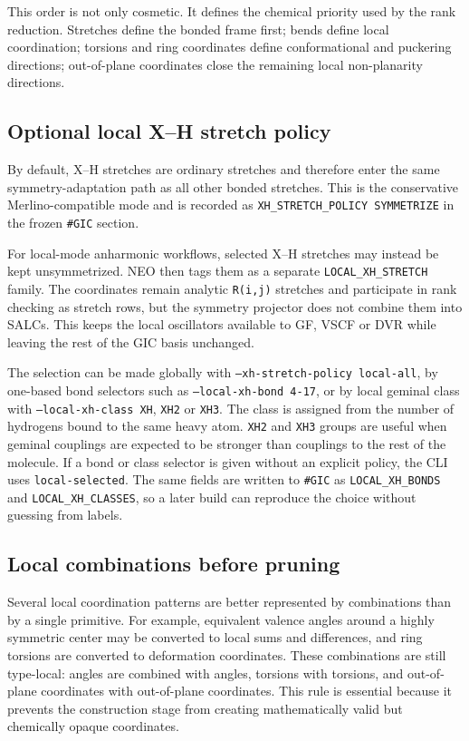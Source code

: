 \documentclass[11pt]{article}
\begin{document}
This order is not only cosmetic.  It defines the chemical priority used by the
rank reduction.  Stretches define the bonded frame first; bends define local
coordination; torsions and ring coordinates define conformational and
puckering directions; out-of-plane coordinates close the remaining local
non-planarity directions.

\subsection{Optional local X--H stretch policy}

By default, X--H stretches are ordinary stretches and therefore enter the same
symmetry-adaptation path as all other bonded stretches.  This is the conservative
Merlino-compatible mode and is recorded as
\texttt{XH\_STRETCH\_POLICY SYMMETRIZE} in the frozen \texttt{\#GIC} section.

For local-mode anharmonic workflows, selected X--H stretches may instead be kept
unsymmetrized.  NEO then tags them as a separate
\texttt{LOCAL\_XH\_STRETCH} family.  The coordinates remain analytic
\texttt{R(i,j)} stretches and participate in rank checking as stretch rows, but
the symmetry projector does not combine them into SALCs.  This keeps the local
oscillators available to GF, VSCF or DVR while leaving the rest of the GIC basis
unchanged.

The selection can be made globally with \texttt{--xh-stretch-policy local-all},
by one-based bond selectors such as \texttt{--local-xh-bond 4-17}, or by local
geminal class with \texttt{--local-xh-class XH}, \texttt{XH2} or
\texttt{XH3}.  The class is assigned from the number of hydrogens bound to the
same heavy atom.  \texttt{XH2} and \texttt{XH3} groups are useful when geminal
couplings are expected to be stronger than couplings to the rest of the
molecule.  If a bond or class selector is given without an explicit policy, the
CLI uses \texttt{local-selected}.  The same fields are written to
\texttt{\#GIC} as \texttt{LOCAL\_XH\_BONDS} and
\texttt{LOCAL\_XH\_CLASSES}, so a later build can reproduce the choice without
guessing from labels.

\subsection{Local combinations before pruning}

Several local coordination patterns are better represented by combinations than
by a single primitive.  For example, equivalent valence angles around a highly
symmetric center may be converted to local sums and differences, and ring
torsions are converted to deformation coordinates.  These combinations are
still type-local: angles are combined with angles, torsions with torsions, and
out-of-plane coordinates with out-of-plane coordinates.  This rule is essential
because it prevents the construction stage from creating mathematically valid
but chemically opaque coordinates.
\end{document}
